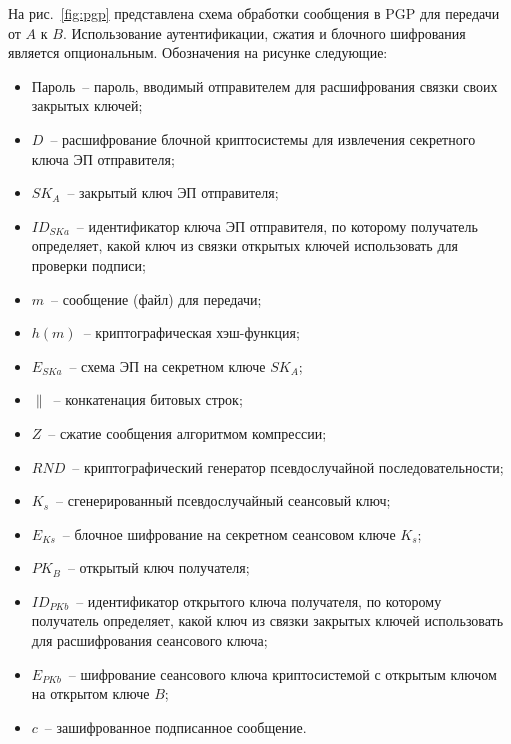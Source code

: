 На рис.~\ref{fig:pgp} представлена схема обработки сообщения в PGP для передачи от $A$ к $B$. Использование аутентификации, сжатия и блочного шифрования является опциональным. Обозначения на рисунке следующие:
\begin{itemize}
    \item Пароль~-- пароль, вводимый отправителем для расшифрования связки своих закрытых ключей;
    \item $D$~-- расшифрование блочной криптосистемы для извлечения секретного ключа ЭП отправителя;
    \item $SK_A$~-- закрытый ключ ЭП отправителя;
    \item $ID_{SKa}$~-- идентификатор ключа ЭП отправителя, по которому получатель определяет, какой ключ из связки открытых ключей использовать для проверки подписи;
    \item $m$~-- сообщение (файл) для передачи;
    \item $h(m)$~-- криптографическая хэш-функция;
    \item $E_{SKa}$~-- схема ЭП на секретном ключе $SK_A$;
    \item $\|$~-- конкатенация битовых строк;
    \item $Z$~-- сжатие сообщения алгоритмом компрессии;
    \item $RND$~-- криптографический генератор псевдослучайной последовательности;
    \item $K_s$~-- сгенерированный псевдослучайный сеансовый ключ;
    \item $E_{Ks}$~-- блочное шифрование на секретном сеансовом ключе $K_s$;
    \item $PK_B$~-- открытый ключ получателя;
    \item $ID_{PKb}$~-- идентификатор открытого ключа получателя, по которому получатель определяет, какой ключ из связки закрытых ключей использовать для расшифрования сеансового ключа;
    \item $E_{PKb}$~-- шифрование сеансового ключа криптосистемой с открытым ключом на открытом ключе $B$;
    \item $c$~-- зашифрованное подписанное сообщение.
\end{itemize}
